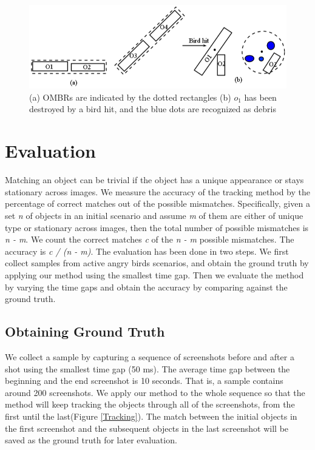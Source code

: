 \documentclass[letterpaper]{article}
\begin{document}
 
\begin{figure}[t!]
\centering\includegraphics[scale=0.3]{OMBRs.png}
\vspace{-2.5mm}
\caption{(a) OMBRs are indicated by the dotted rectangles (b) $o_1$ has been destroyed by a bird hit, and the blue dots are recognized as debris}  
\label{OMBRs}
\vspace{-7mm}
\end{figure}

\vspace{-2mm}
\section{Evaluation}

Matching an object can be trivial if the object has a unique appearance or stays stationary across images. We measure the accuracy of the tracking method by the percentage of correct matches out of the possible mismatches. Specifically, given a set \emph{n} of objects in an initial scenario and assume \emph{m} of them are either of unique type or stationary across images, then the total number of possible mismatches is \emph{n - m}. We count the correct matches \emph{c} of the \emph{n - m} possible mismatches. The accuracy is  \emph{c / (n - m)}. The evaluation has been done in two steps. We first collect samples from active angry birds scenarios, and obtain the ground truth by applying our method using the smallest time gap. Then we evaluate the method by varying the time gaps and obtain the accuracy by comparing against the ground truth.

 
\subsection{Obtaining Ground Truth}

We collect a sample by capturing a sequence of screenshots before and after a shot using the smallest time gap (50 ms). The average time gap between the beginning and the end screenshot is 10 seconds. That is, a sample contains around 200 screenshots.  We apply our method to the whole sequence so that the method will keep tracking the objects through all of the screenshots, from the first until the last(Figure \ref{Tracking}). The match between the initial objects in the first screenshot and the subsequent objects in the last screenshot will be saved as the ground truth for later evaluation. %
\end{document}
